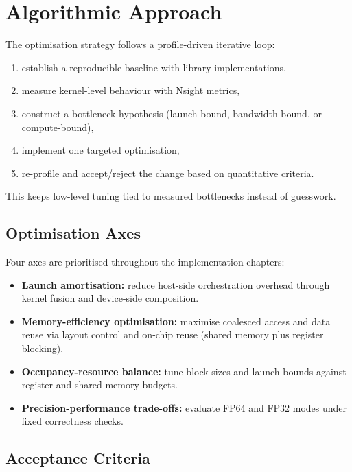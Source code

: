 \section{Algorithmic Approach}\label{sec:algorithmic-approach}

The optimisation strategy follows a profile-driven iterative loop:

\begin{enumerate}
  \item establish a reproducible baseline with library implementations,
  \item measure kernel-level behaviour with Nsight metrics,
  \item construct a bottleneck hypothesis (launch-bound, bandwidth-bound, or
    compute-bound),
  \item implement one targeted optimisation,
  \item re-profile and accept/reject the change based on quantitative criteria.
\end{enumerate}

This keeps low-level tuning tied to measured bottlenecks instead of guesswork.

\subsection{Optimisation Axes}

Four axes are prioritised throughout the implementation chapters:

\begin{itemize}
  \item \textbf{Launch amortisation:} reduce host-side orchestration overhead
    through kernel fusion and device-side composition.
  \item \textbf{Memory-efficiency optimisation:} maximise coalesced access and
    data reuse via layout control and on-chip reuse (shared memory plus register
    blocking).
  \item \textbf{Occupancy-resource balance:} tune block sizes and
    launch-bounds against register and shared-memory budgets.
  \item \textbf{Precision-performance trade-offs:} evaluate FP64 and FP32
    modes under fixed correctness checks.
\end{itemize}

\subsection{Acceptance Criteria}

